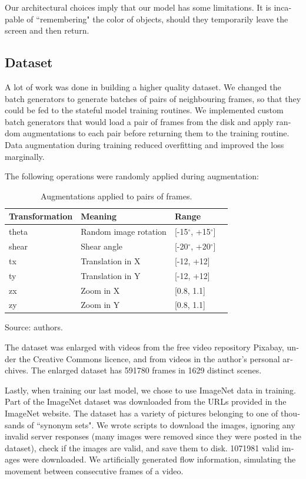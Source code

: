 \documentclass[12pt,openright,oneside,a4paper,english, brazilian]{abntex2}
\begin{document}
\begin{otherlanguage}{english}
Our architectural choices imply that our model has some limitations. It is incapable of ``remembering" the color of objects, should they temporarily leave the screen and then return.

\subsection{Dataset}

A lot of work was done in building a higher quality dataset. We changed the batch generators to generate batches of pairs of neighbouring frames, so that they could be fed to the stateful model training routines. We implemented custom batch generators that would load a pair of frames from the disk and apply random augmentations to each pair before returning them to the training routine. Data augmentation during training reduced overfitting and improved the loss marginally.

The following operations were randomly applied during augmentation:

\begin{table}[H]
    \centering
    \caption{Augmentations applied to pairs of frames.}
    \begin{tabular}{llll}
    Transformation & Meaning               & Range          &  \\ \hline
    theta          & Random image rotation & [-15$^{\circ}$, +15$^{\circ}$]   &  \\
    shear          & Shear angle           & [-20$^{\circ}$, +20$^{\circ}$] &  \\ \hline
    tx             & Translation in X      & [-12, +12]       &  \\
    ty             & Translation in Y      & [-12, +12]       &  \\ \hline
    zx             & Zoom in X             & [0.8, 1.1]       &  \\
    zy             & Zoom in Y             & [0.8, 1.1]       &  \\ \hline
    \end{tabular}
    Source: authors.
    \label{table:augmentations}
\end{table}

The dataset was enlarged with videos from the free video repository Pixabay, under the Creative Commons licence, and from videos in the author's personal archives. The enlarged dataset has 591780 frames in 1629 distinct scenes.

Lastly, when training our last model, we chose to use ImageNet \cite{imagenet_cvpr09} data in training. Part of the ImageNet dataset was downloaded from the URLs provided in the ImageNet website. The dataset has a variety of pictures belonging to one of thousands of ``synonym sets". We wrote scripts to download the images, ignoring any invalid server responses (many images were removed since they were posted in the dataset), check if the images are valid, and save them to disk. 1071981 valid images were downloaded.  We artificially generated flow information, simulating the movement between consecutive frames of a video.


\end{otherlanguage}
\end{document}
